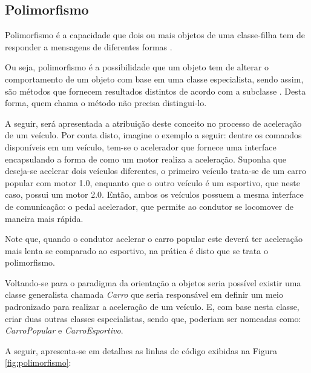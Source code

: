 \subsection{Polimorfismo}

Polimorfismo é a capacidade que dois ou mais objetos de uma classe-filha tem  de
responder a mensagens de diferentes formas
\cite{php5ConceitosProgramacaoEIntegracaoComBancoDeDados}.

Ou seja, polimorfismo é a possibilidade que um objeto tem de alterar o
comportamento de um objeto com base em uma classe especialista, sendo assim,
são métodos que fornecem resultados distintos  de acordo com a subclasse
\cite{php5ConceitosProgramacaoEIntegracaoComBancoDeDados}. Desta forma, quem
chama o método não precisa distingui-lo.

A seguir, será apresentada a atribuição deste conceito no processo de aceleração
de um veículo. Por conta disto, imagine o exemplo a seguir: dentre os comandos
disponíveis em um veículo, tem-se o acelerador que fornece uma interface
encapsulando a forma de como um motor realiza a aceleração. Suponha que
deseja-se acelerar dois veículos diferentes, o primeiro veículo trata-se de um 
carro popular com motor 1.0, enquanto que o outro veículo é um esportivo, que
neste caso, possui um motor 2.0. Então, ambos os veículos possuem a mesma
interface de comunicação: o pedal acelerador, que permite ao condutor se
locomover de maneira mais rápida.

Note que, quando o condutor acelerar o carro popular este deverá ter aceleração
mais lenta se comparado ao esportivo, na prática é disto que se trata o polimorfismo.

Voltando-se para o paradigma da orientação a objetos seria possível existir uma
classe generalista chamada \textit{Carro} que seria responsável em definir um
meio padronizado para realizar a aceleração de um veículo. E, com base nesta
classe, criar duas outras classes especialistas, sendo que, poderiam ser
nomeadas como: \textit{CarroPopular} e \textit{CarroEsportivo}.

A seguir, apresenta-se em detalhes as linhas de código exibidas na Figura
\ref{fig:polimorfismo}:

